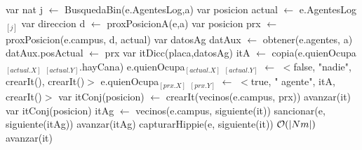 \begin{algorithm}[H]
\begin{algorithmic}[1]
 
    \State var nat j $\gets$ BusquedaBin(e.AgentesLog,a) 
    \State var posicion actual $\gets$ e.AgentesLog$_{[j]}$ 
    \State var direccion d $\gets$ proxPosicionA(e,a) 
    \State var posicion prx $\gets$ proxPosicion(e.campus, d, actual) 
    \State var datosAg datAux $\gets$ obtener(e.agentes, a) 
    \State datAux.posActual $\gets$ prx 
    \State var itDicc(placa,datosAg) itA $\gets$ copia(e.quienOcupa$_{[actual.X]}$ $_{[actual.Y]}$.hayCana) 
    \State e.quienOcupa$_{[actual.X]}$ $_{[actual.Y]}$ $\gets$ $<$false, "nadie", crearIt(), crearIt()$>$ 
    \State e.quienOcupa$_{[prx.X]}$ $_{[prx.Y]}$ $\gets$ $<$true, " agente", itA, crearIt()$>$ 
    \State var itConj(posicion) $\gets$ crearIt(vecinos(e.campus, prx)) 
     
    		\State avanzar(it)
    	\Else
    		 
    			\State var itConj(posicion) itAg $\gets$ vecinos(e.campus, siguiente(it)) 
    			  
    				  
    					\State sancionar(e, siguiente(itAg))  
    				\EndIf
	    			\State avanzar(itAg)
    			\EndWhile
    		\Else
    			  
    				\State capturarHippie(e, siguiente(it))  \Comment $\mathcal{O}(\vert Nm \vert)$
    			\EndIf
    		\EndIf
    	\EndIf	
    	\State avanzar(it)
    \EndWhile
\EndFunction
\end{algorithmic}
\end{algorithm}

